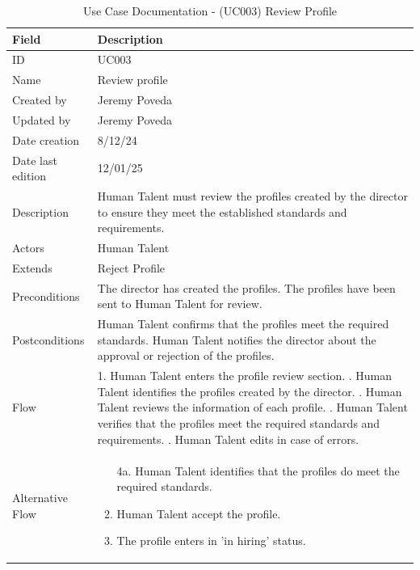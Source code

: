 \documentclass{scrreprt}
\begin{document}
\begin{table}[H]
	\centering
	\begin{tabular}{|p{3cm}|p{10cm}|}
		\hline
		\textbf{Field} & \textbf{Description} \\ \hline
		ID & UC003 \\ \hline
		Name & Review profile \\ \hline
		Created by &  Jeremy Poveda \\ \hline
		Updated by & Jeremy Poveda \\ \hline
		Date creation & 8/12/24 \\ \hline
		Date last edition & 12/01/25 \\ \hline
		Description & Human Talent must review the profiles created by the director to ensure they meet the established standards and requirements. \\ \hline
		Actors & Human Talent \\ \hline
		Extends & Reject Profile \\ \hline
		Preconditions & 
		The director has created the profiles.  \newline
		The profiles have been sent to Human Talent for review.
		\\ \hline
		Postconditions & 
		Human Talent confirms that the profiles meet the required standards. \newline
		Human Talent notifies the director about the approval or rejection of the profiles.
		\\ \hline
		Flow & 
		1. Human Talent enters the profile review section. \newline
		2. Human Talent identifies the profiles created by the director. \newline
		3. Human Talent reviews the information of each profile. \newline
		4. Human Talent verifies that the profiles meet the required standards and requirements. \newline
		5. Human Talent edits in case of errors. 
		\\ \hline
		Alternative Flow & 
		\begin{enumerate}
			\item[4a.] Human Talent identifies that the profiles do meet the required standards.
			\item Human Talent accept the profile.
			\item The profile enters in 'in hiring' status.
		\end{enumerate} 
		\\ \hline
	\end{tabular}
	\caption{Use Case Documentation  - (UC003) Review Profile}
	\label{table:UC003}
\end{table}
\end{document}
